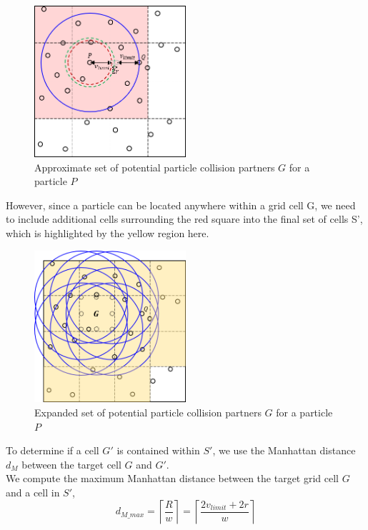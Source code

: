 \documentclass[12pt]{article}
\begin{document}
\begin{figure}[H]
    \centering
    \includegraphics[width=0.5\textwidth]{./reportAssets/chap8ApproxCollision}
    \caption{Approximate set of potential particle collision partners $G$ for a particle $P$}
    \label{fig:chap8ApproxCollision}
\end{figure}

However, since a particle can be located anywhere within a grid cell G, we need to include additional cells surrounding the red square into the final set of cells S', which is highlighted by the yellow region here. \\

\begin{figure}[H]
    \centering
    \includegraphics[width=0.5\textwidth]{./reportAssets/chap8ExpandedSet}
    \caption{Expanded set of potential particle collision partners $G$ for a particle $P$}
    \label{fig:chap8ExpandedSet}
\end{figure}

To determine if a cell $G'$ is contained within $S'$, we use the Manhattan distance $d_M$ between the target cell $G$ and $G'$. \\

We compute the maximum Manhattan distance between the target grid cell $G$ and a cell in $S'$,
$$d_{M\_max} = \left\lceil{\frac{R}{w}}\right\rceil = \left\lceil{\frac{2v_{limit} + 2r}{w}}\right\rceil$$
\end{document}
